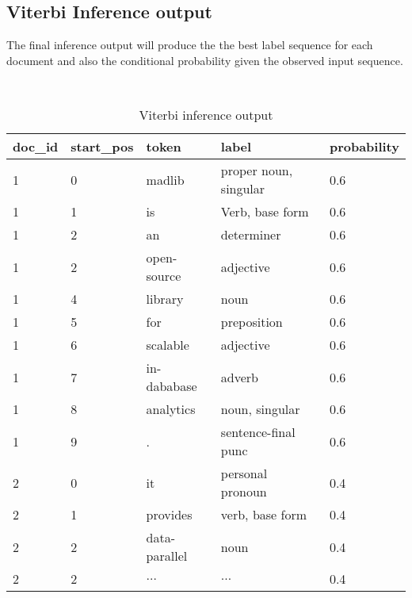 \subsection{Viterbi Inference output}
The final inference output will produce the the best label sequence for each document and also the conditional probability given the
observed input sequence.
\begin {table}[h]
\caption {Viterbi inference output}
\begin{center}
    \scriptsize\tt
    \begin{tabular}{ | l | l | l | l | l | }
    \hline
    doc\_id & start\_pos & token & label & probability     \\\hline
    1   & 0    & madlib        & proper noun, singular &0.6\\
    1   & 1    & is            & Verb, base form       &0.6 \\
    1   & 2    & an            & determiner            &0.6 \\
    1   & 2    & open-source   & adjective             &0.6 \\
    1   & 4    & library       & noun                  &0.6 \\
    1   & 5    & for           & preposition           &0.6 \\
    1   & 6    & scalable      & adjective             &0.6 \\
    1   & 7    & in-dababase   & adverb                &0.6 \\
    1   & 8    & analytics     & noun, singular        &0.6 \\
    1   & 9    & .             & sentence-final punc   &0.6 \\
    2   & 0    & it            & personal pronoun      &0.4 \\
    2   & 1    & provides      & verb, base form       &0.4 \\
    2   & 2    & data-parallel & noun                  &0.4 \\
    2   & 2    & $\ldots$      & $\ldots$                    &0.4 \\
    \hline
    \end{tabular}
\end{center}
\end{table}
